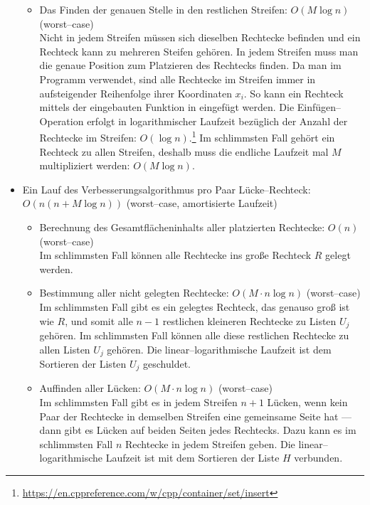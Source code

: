 \begin{itemize}
\begin{itemize}
		\item Das Finden der genauen Stelle in den restlichen Streifen: $O(M \log n)$ (worst--case)\\
		Nicht in jedem Streifen müssen sich dieselben Rechtecke befinden und ein Rechteck 
		kann zu mehreren Steifen gehören.
		In jedem Streifen muss man die genaue Position zum Platzieren des Rechtecks finden.
		Da man im Programm  verwendet, sind alle Rechtecke im Streifen
		immer in aufsteigender Reihenfolge ihrer Koordinaten $x_i$. 
		So kann ein Rechteck mittels der eingebauten Funktion  
		in  eingefügt werden. Die Einfügen--Operation erfolgt in logarithmischer Laufzeit
		bezüglich der Anzahl der Rechtecke im Streifen: $O(\log n)$.\footnote{
		\href{https://en.cppreference.com/w/cpp/container/set/insert}{https://en.cppreference.com/w/cpp/container/set/insert}}
		Im schlimmsten Fall gehört ein Rechteck zu allen Streifen, deshalb muss die endliche Laufzeit
		mal $M$ multipliziert werden: $O(M \log n)$.


	\end{itemize}

	\item Ein Lauf des Verbesserungsalgorithmus pro Paar Lücke--Rechteck: $O(n(n + M \log n))$ (worst--case, amortisierte Laufzeit)

	\begin{itemize}
		\item Berechnung des Gesamtflächeninhalts aller platzierten Rechtecke: $O(n)$ (worst--case)\\
		Im schlimmsten Fall können alle Rechtecke ins große Rechteck $R$ gelegt werden.

		\item Bestimmung aller nicht gelegten Rechtecke: $O(M \cdot n \log n)$ (worst--case)\\
		Im schlimmsten Fall gibt es ein gelegtes Rechteck, das genauso groß ist wie $R$, und somit
		alle $n-1$ restlichen kleineren Rechtecke zu Listen $U_j$ gehören. 
		Im schlimmsten Fall können alle diese restlichen Rechtecke zu allen Listen $U_j$ gehören.
		Die linear--logarithmische Laufzeit ist dem Sortieren der Listen $U_j$ geschuldet.

		\item Auffinden aller Lücken: $O(M \cdot n \log n)$ (worst--case)\\
		Im schlimmsten Fall gibt es in jedem Streifen $n+1$ Lücken, wenn kein Paar
		der Rechtecke in demselben Streifen eine gemeinsame Seite hat ---
		dann gibt es Lücken auf beiden Seiten
		jedes Rechtecks. Dazu kann es im schlimmsten Fall $n$ Rechtecke in jedem Streifen geben.
		Die linear--logarithmische Laufzeit ist mit dem Sortieren der Liste $H$ verbunden.


\end{itemize}
\end{itemize}
